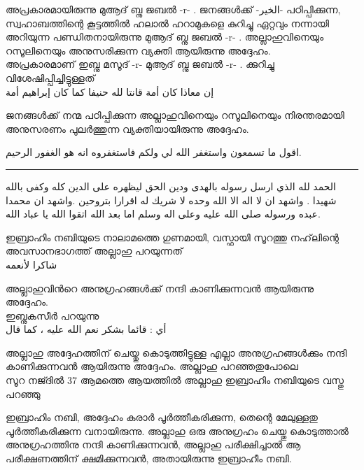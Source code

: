  അപ്രകാരമായിരുന്നു മുആദ് ബ്നു ജബൽ -r- . 
 ജനങ്ങൾക്ക് -\textarabic{الخير}- പഠിപ്പിക്കുന്ന, 
 സ്വഹാബത്തിന്റെ കൂട്ടത്തിൽ ഹലാൽ ഹറാമുകളെ കുറിച്ചു ഏറ്റവും നന്നായി അറിയുന്ന പണ്ഡിതനായിരുന്നു മുആദ് ബ്നു ജബൽ -r- . 
 അല്ലാഹുവിനെയും റസൂലിനെയും അനുസരിക്കുന്ന വ്യക്തി ആയിരുന്നു അദ്ദേഹം. \\
 
 അപ്രകാരമാണ് ഇബ്നു മസൂദ് -r- മുആദ് ബ്നു ജബൽ -r- .  ക്കുറിച്ചു വിശേഷിപ്പിച്ചിട്ടുള്ളത് \\
 
  \textarabic{ إن معاذا كان أمة قانتا لله حنيفا كما كان إبراهيم أمة}
 
 ജനങ്ങൾക്ക് നന്മ പഠിപ്പിക്കുന്ന അല്ലാഹുവിനെയും റസൂലിനെയും നിരന്തരമായി അനുസരണം പുലർത്തുന്ന വ്യക്തിയായിരുന്നു അദ്ദേഹം. \\
 
 \begin{center}


 \textarabic{اقول ما تسمعون واستغفر الله لي ولكم فاستغفروه انه هو الغفور الرحيم.} \\ 
   \end{center}
 	\hrule 
\pagebreak

 \textarabic{	الحمد لله الذي ارسل رسوله بالهدى ودين الحق ليظهره على الدين كله وكفى بالله شهيدا . واشهد ان لا اله الا الله وحده لا شريك له اقرارا بتروحين  .واشهد ان محمدا عبده ورسوله صلى الله عليه وعلى اله وسلم اما بعد الله 	
 	اتقوا الله يا عباد الله. }
 
 
 
 
 ഇബ്രാഹിം നബിയുടെ നാലാമത്തെ ഗുണമായി, വസ്ഫായി സൂറത്തു നഹ്‌ലിന്റെ അവസാനഭാഗത്ത് അല്ലാഹു പറയുന്നത് \\
 
 
 \textarabic{شاكرا لأنعمه}
 
 അല്ലാഹുവിൻറെ അനുഗ്രഹങ്ങൾക്ക് നന്ദി കാണിക്കുന്നവൻ ആയിരുന്നു അദ്ദേഹം. \\
 
  ഇബ്നുകസീർ പറയുന്നു \\
  \textarabic{أي : قائما بشكر نعم الله عليه ، كما قال}
 
 അല്ലാഹു അദ്ദേഹത്തിന് ചെയ്തു കൊടുത്തിട്ടുള്ള എല്ലാ അനുഗ്രഹങ്ങൾക്കും നന്ദി കാണിക്കുന്നവൻ ആയിരുന്നു അദ്ദേഹം.  അല്ലാഹു പറഞ്ഞതുപോലെ \\
   \textarabic{\quranayah[53][37]} 
 സൂറ നജ്ദിൽ 37 ആമത്തെ ആയത്തിൽ അല്ലാഹു ഇബ്രാഹിം നബിയുടെ വസ്തു പറഞ്ഞു 
 
 ഇബ്രാഹിം നബി, അദ്ദേഹം കരാർ പൂർത്തീകരിക്കുന്ന, തെന്റെ മേലുള്ളതു  പൂർത്തീകരിക്കുന്ന വനായിരുന്നു.  അല്ലാഹു ഒരു അനുഗ്രഹം  ചെയ്തു  കൊടുത്താൽ അനുഗ്രഹത്തിനു നന്ദി കാണിക്കുന്നവൻ,  അല്ലാഹു പരീക്ഷിച്ചാൽ ആ പരീക്ഷണത്തിന് ക്ഷമിക്കുന്നവൻ,  അതായിരുന്നു ഇബ്രാഹീം നബി. \\
 
